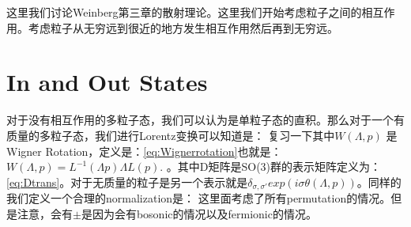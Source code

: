 这里我们讨论Weinberg第三章的散射理论。这里我们开始考虑粒子之间的相互作用。考虑粒子从无穷远到很近的地方发生相互作用然后再到无穷远。

\section{In and Out States}
对于没有相互作用的多粒子态，我们可以认为是单粒子态的直积。那么对于一个有质量的多粒子态，我们进行Lorentz变换可以知道是：
复习一下其中$ W(\Lambda,p) $ 是Wigner Rotation，定义是：\cref{eq:Wignerrotation}也就是：$ W(\Lambda,p)=L^{-1}(\Lambda p)\Lambda L(p). $ 。其中D矩阵是SO(3)群的表示矩阵定义为：\cref{eq:Dtrans}。对于无质量的粒子是另一个表示就是$ \delta_{\sigma,\sigma'} exp(i \sigma \theta(\Lambda,p))$。同样的我们定义一个合理的normalization是：
这里面考虑了所有permutation的情况。但是注意，会有$ \pm $是因为会有bosonic的情况以及fermionic的情况。

